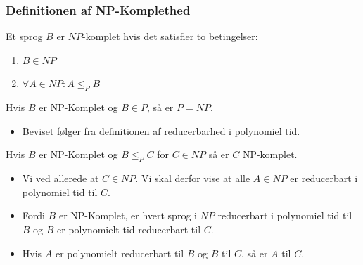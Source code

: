 \begin{frame}[allowframebreaks]
	\frametitle{Definitionen af NP-Komplethed}
	\begin{definition}
		Et sprog $B$ er $NP$-komplet hvis det satisfier to betingelser:
		\begin{enumerate}
			\item $B \in NP$
			\item $\forall A \in NP : A \le_{P} B$
		\end{enumerate}
	\end{definition}

	\begin{theorem}
		Hvis $B$ er NP-Komplet og $B \in P$, så er $P = NP$.
	\end{theorem}

	\begin{itemize}
		\item Beviset følger fra definitionen af reducerbarhed i polynomiel tid.
	\end{itemize}

	\begin{theorem}
		Hvis $B$ er NP-Komplet og $B \le_{P} C$ for $C \in NP$ så er $C$ NP-komplet.
	\end{theorem}
	\begin{itemize}
		\item Vi ved allerede at $C \in NP$. Vi skal derfor vise at alle $A \in NP$ er reducerbart i polynomiel tid til $C$.
		\item Fordi $B$ er NP-Komplet, er hvert sprog i $NP$ reducerbart i polynomiel tid til $B$ og $B$ er polynomielt tid reducerbart til $C$.
		\item Hvis $A$ er polynomielt reducerbart til $B$  og $B$ til $C$, så er $A$ til $C$.
	\end{itemize}
\end{frame}

